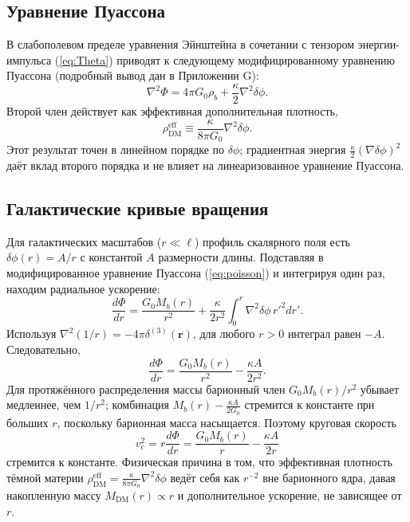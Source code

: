 \documentclass[12pt,a4paper]{article}
\begin{document}
	\subsection{Уравнение Пуассона}
	В слабополевом пределе уравнения Эйнштейна в сочетании с тензором энергии-импульса (\ref{eq:Theta}) приводят к следующему модифицированному уравнению Пуассона (подробный вывод дан в Приложении G):
	\begin{equation}
		\nabla^2 \Phi = 4\pi G_0 \rho_b + \frac{\kappa}{2} \nabla^2 \delta\phi.
		\label{eq:poisson}
	\end{equation}
	Второй член действует как эффективная дополнительная плотность,
	\begin{equation}
		\rho_{\mathrm{DM}}^{\mathrm{eff}} \equiv \frac{\kappa}{8\pi G_0} \nabla^2 \delta\phi.
		\label{eq:rhoDM}
	\end{equation}
	Этот результат точен в линейном порядке по \(\delta\phi\); градиентная энергия \(\frac{\kappa}{2}(\nabla\delta\phi)^2\) даёт вклад второго порядка и не влияет на линеаризованное уравнение Пуассона.
	
	\subsection{Галактические кривые вращения}
	Для галактических масштабов (\(r \ll \ell\)) профиль скалярного поля есть \(\delta\phi(r) = A/r\) с константой \(A\) размерности длины. Подставляя в модифицированное уравнение Пуассона (\ref{eq:poisson}) и интегрируя один раз, находим радиальное ускорение:
	\[
	\frac{d\Phi}{dr} = \frac{G_0 M_b(r)}{r^2} + \frac{\kappa}{2r^2} \int_0^r \nabla^2\delta\phi \, r'^2 dr'.
	\]
	Используя \(\nabla^2(1/r) = -4\pi\delta^{(3)}(\mathbf{r})\), для любого \(r>0\) интеграл равен \(-A\). Следовательно,
	\[
	\frac{d\Phi}{dr} = \frac{G_0 M_b(r)}{r^2} - \frac{\kappa A}{2r^2}.
	\]
	Для протяжённого распределения массы барионный член \(G_0 M_b(r)/r^2\) убывает медленнее, чем \(1/r^2\); комбинация \(M_b(r) - \frac{\kappa A}{2G_0}\) стремится к константе при больших \(r\), поскольку барионная масса насыщается. Поэтому круговая скорость
	\[
	v_c^2 = r\frac{d\Phi}{dr} = \frac{G_0 M_b(r)}{r} - \frac{\kappa A}{2r}
	\]
	стремится к константе. Физическая причина в том, что эффективная плотность тёмной материи \(\rho_{\mathrm{DM}}^{\mathrm{eff}} = \frac{\kappa}{8\pi G_0} \nabla^2\delta\phi\) ведёт себя как \(r^{-2}\) вне барионного ядра, давая накопленную массу \(M_{\mathrm{DM}}(r) \propto r\) и дополнительное ускорение, не зависящее от \(r\).
	
\end{document}
